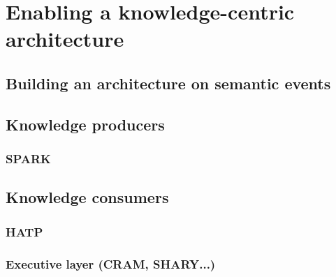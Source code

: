 \chapter{Enabling a knowledge-centric architecture}
\label{chapter|architecture}

\section{Building an architecture on semantic events}
\label{sect|events}

\section{Knowledge producers}
\label{sect|producers}

\subsection{SPARK}
\label{subssect|spark}

\section{Knowledge consumers}
\label{sect|consumers}

\subsection{HATP}
\label{subssect|hatp}

\subsection{Executive layer (CRAM, SHARY...)}
\label{subssect|supervision}
